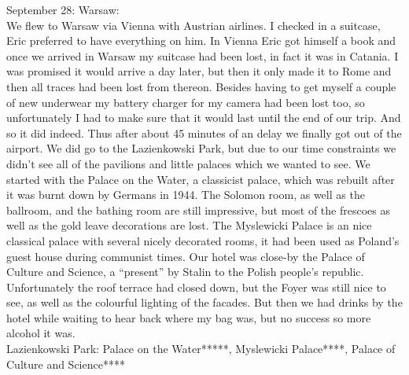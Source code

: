 September 28: Warsaw:\\
We flew to Warsaw via Vienna with Austrian airlines. I checked in a suitcase, Eric preferred to have everything on him. In Vienna Eric got himself a book and once we arrived in Warsaw my suitcase had been lost, in fact it was in Catania. I was promised it would arrive a day later, but then it only made it to Rome and then all traces had been lost from thereon. Besides having to get myself a couple of new underwear my battery charger for my camera had been lost too, so unfortunately I had to make sure that it would last until the end of our trip. And so it did indeed. Thus after about 45 minutes of an delay we finally got out of the airport. We did go to the Lazienkowski Park, but due to our time constraints we didn't see all of the pavilions and little palaces which we wanted to see. We started with the Palace on the Water, a classicist palace, which was rebuilt after it was burnt down by Germans in 1944. The Solomon room, as well as the ballroom, and the bathing room are still impressive, but most of the frescoes as well as the gold leave decorations are lost. The Myslewicki Palace is an nice classical palace with several nicely decorated rooms, it had been used as Poland's guest house during communist times. Our hotel was close-by the Palace of Culture and Science, a ``present'' by Stalin to the Polish people's republic. Unfortunately the roof terrace had closed down, but the Foyer was still nice to see, as well as the colourful lighting of the facades. But then we had drinks by the hotel while waiting to hear back where my bag was, but no success so more alcohol it was.\\

Lazienkowski Park: Palace on the Water*****, Myslewicki Palace****, Palace of Culture and Science****\\

